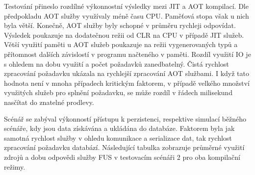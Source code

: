 
Testování přineslo rozdílné výkonnostní výsledky mezi JIT a AOT kompilací. Dle předpokladu AOT služby využívaly méně času CPU. Paměťová stopa však u nich byla větší. Konečně, AOT služby byly schopné v průměru rychleji odpovídat. Výsledek poukazuje na dodatečnou režii od CLR na CPU v případě JIT služeb. Větší využití paměti u AOT služeb poukazuje na režii vygenerovaných typů a přítomnost dalších závislostí v programu načteného v paměti. Rozdíl využití IO je s ohledem na dobu využití a počet požadavků zanedbatelný. Čistá rychlost zpracování požadavku ukázala na rychlejší zpracování AOT službami. I když tato hodnota není v mnoha případech kritickým faktorem, v případě velkého množství využitých služeb pro splnění požadavku, se může rozdíl v řádech milisekund nasčítat do znatelné prodlevy.


Scénář se zabýval výkonností přístupu k perzistenci, respektive simulací běžného scénáře, kdy jsou data získávána a ukládána do databáze. Faktorem byla jak samotná rychlost služby v ohledu komunikace a serializace dat, tak rychlost zpracování požadavku databází. Následující tabulka zobrazuje průměrné využití zdrojů a dobu odpovědi služby FUS v testovacím scénáři 2 pro oba kompilační režimy.


